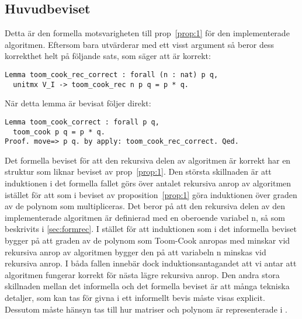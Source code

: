 \subsection{Huvudbeviset}
Detta är den formella motsvarigheten till prop~\ref{prop:1} för den
implementerade algoritmen. Eftersom  bara utvärderar
 med ett visst argument så beror dess korrekthet helt på
följande sats, som säger att  är korrekt:
\begin{lstlisting}
Lemma toom_cook_rec_correct : forall (n : nat) p q,
  unitmx V_I -> toom_cook_rec n p q = p * q.
\end{lstlisting}
När detta lemma är bevisat följer  direkt:
\begin{lstlisting}
Lemma toom_cook_correct : forall p q,
  toom_cook p q = p * q.
Proof. move=> p q. by apply: toom_cook_rec_correct. Qed.
\end{lstlisting}
Det formella beviset för att den rekursiva delen av algoritmen är korrekt har
en struktur som liknar beviset av prop~\ref{prop:1}.
Den största skillnaden är att induktionen i det formella fallet görs över antalet
rekursiva anrop av algoritmen istället för att som i beviset av
proposition~\ref{prop:1} göra induktionen över graden av de polynom som multipliceras. Det beror
på att den rekursiva delen av den implementerade algoritmen 
är definierad med en oberoende variabel n, så som beskrivits i
\ref{sec:formrec}. I stället för att induktionen som i det informella
beviset bygger på att graden av de polynom som Toom-Cook anropas med minskar
vid rekursiva anrop av algoritmen bygger den på att variabeln n minskas vid
rekursiva anrop. I båda fallen innebär dock induktionsantagandet att vi antar
att algoritmen fungerar korrekt för nästa lägre rekursiva anrop.
Den andra stora skillnaden mellan det informella och det formella beviset är
att många tekniska detaljer, som kan tas för givna i ett informellt bevis måste
visas explicit. Dessutom måste hänsyn tas till hur matriser och polynom är
representerade i \ssr{}.

